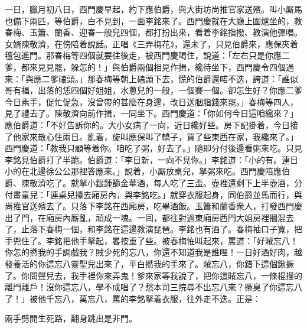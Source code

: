 一日，臘月初八日，西門慶早起，約下應伯爵，與大街坊尚推官家送殯。叫小厮馬也備下兩匹，等伯爵，白不見到，一面李銘來了。西門慶就在大廳上圍爐坐的，教春梅、玉簫、蘭香、迎春一般兒四個，都打扮出來，看着李銘指撥、教演他彈唱。女婿陳敬濟，在傍陪着說話。正唱《三弄梅花》，還未了，只見伯爵來，應保夾着氊包進門。那春梅等四個就要往後走，被西門慶喝住，說道：「左右只是你應二爹，都來見見罷，躲怎的！」與伯爵兩個相見作揖，纔待坐下，西門慶令四個過來：「與應二爹磕頭。」那春梅等朝上磕頭下去，慌的伯爵還喏不迭，誇道：「誰似哥有福，出落的恁四個好姐姐，水蔥兒的一般，一個賽一個。卻怎生好？你應二爹今日素手，促忙促急，沒曾帶的甚麼在身邊，改日送胭脂錢來罷。」春梅等四人，見了禮去了。陳敬濟向前作揖，一同坐下。西門慶道：「你如何今日這咱纔來？」應伯爵道：「不好告訴你的。大小女病了一向，近日纔好些。房下記掛着，今日接了他家來散心住兩日。亂着，旋叫應保叫了轎子，買了些東西在家，我纔來了。」{}西門慶道：「教我只顧等着你。咱吃了粥，好去了。」隨即分付後邊看粥來吃。只見李銘見伯爵打了半跪。伯爵道：「李日新，一向不見你。」李銘道：「小的有。連日小的在北邊徐公公那裡答應來。」說着，小厮放桌兒，拏粥來吃。西門慶陪應伯爵、陳敬濟吃了。就拏小銀鍾篩金華酒，每人吃了三盃。壺裡還剩下上半壺酒，分付畫童兒：「連桌兒擡去廂房內，與李銘吃。」{}就穿衣服起身，同伯爵並馬而行，與尚推官送殯去了。只落下李銘在西廂房，吃畢酒飯。玉簫和蘭香衆人，打發西門慶出了門，在廂房內厮亂，頑成一塊。{}一囘，都往對過東廂房西門大姐房裡摑混去了，止落下春梅一個，和李銘在這邊教演琵琶。李銘也有酒了。春梅袖口子寬，把手兜住了。李銘把他手拏起，畧按重了些。被春梅恠叫起來，{}罵道：「好賊忘八！你怎的撚我的手調戲我？賊少死的忘八，你還不知道我是誰哩！{}一日好酒好肉，越發養活的你這忘八靈聖兒出來了，{}平白撚我的手來了。賊忘八，你錯下這個鍬撅了。你問聲兒去，我手裡你來弄鬼！爹來家等我說了，把你這賊忘八，一條棍攆的離門離戶！沒你這忘八，學不成唱了？愁本司三院尋不出忘八來？撅臭了你這忘八了！」被他千忘八，萬忘八，罵的李銘拏着衣服，往外走不迭。正是：

\begin{myquote} 
兩手劈開生死路，翻身跳出是非門。
\end{myquote} 

